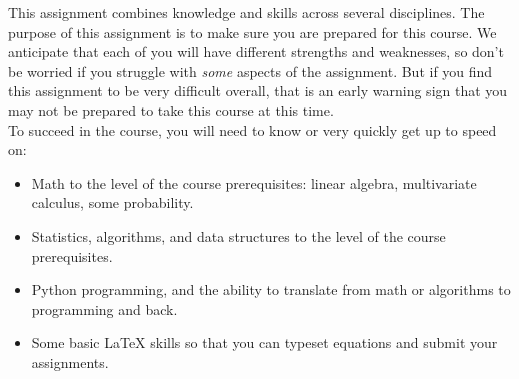 

\usepackage{macros}
\usepackage{listings}
\usepackage{xcolor}



\lstset{style=mystyle}

\author{
\Large
Homework 1: Background Review + Building a classifier 
}




\maketitle

This assignment combines knowledge and skills across several disciplines. 
The purpose of this assignment is to make sure you are prepared for this course. We anticipate that each
of you will have different strengths and weaknesses, so don't be worried if you struggle with \emph{some} aspects
of the assignment. But if you find this assignment to be very difficult overall, that is an early warning sign that you may not be prepared to take this course at this time. \\ 

To succeed in the course, you will need to know or very quickly get up to speed on:
\begin{itemize}
\item Math to the level of the course prerequisites: linear algebra, multivariate calculus, some probability.
\item Statistics, algorithms, and data structures to the level of the course prerequisites.
\item Python programming, and the ability to translate from math or algorithms to programming and back.
\item Some basic LaTeX skills so that you can typeset equations and submit your assignments.
\end{itemize}

